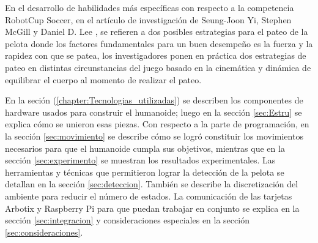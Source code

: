 En el desarrollo de habilidades más específicas con respecto a la competencia RobotCup Soccer, en el artículo de investigación de Seung-Joon Yi, Stephen McGill y Daniel D. Lee  \cite{paper2}, se refieren a dos posibles estrategias para el pateo de la pelota donde los factores fundamentales para un buen desempeño es la fuerza y la rapidez con que se patea, los investigadores ponen en pr\'actica dos estrategias de pateo en distintas circunstancias del juego basado en la cinemática y dinámica de equilibrar el cuerpo al momento de realizar el pateo.

En la seción (\ref{chapter:Tecnologias_utilizadas}) se describen los componentes de hardware usados para construir el humanoide; luego en la sección \ref{sec:Estru}
se explica cómo se unieron esas piezas. Con respecto a la parte de programación, en la secci\'on \ref{sec:movimiento} se describe c\'omo se logró constituir los movimientos necesarios para que el humanoide cumpla sus objetivos, mientras que en la secci\'on \ref{sec:experimento} se muestran los resultados experimentales. Las herramientas y técnicas  que  permitieron lograr  la detección de la pelota se detallan en la secci\'on \ref{sec:deteccion}. También se describe la discretización del ambiente para reducir el n\'umero de estados. La comunicación de las tarjetas Arbotix y Raspberry Pi para que puedan trabajar en conjunto se explica en la secci\'on \ref{sec:integracion}  y consideraciones especiales en la secci\'on \ref{sec:consideraciones}.
